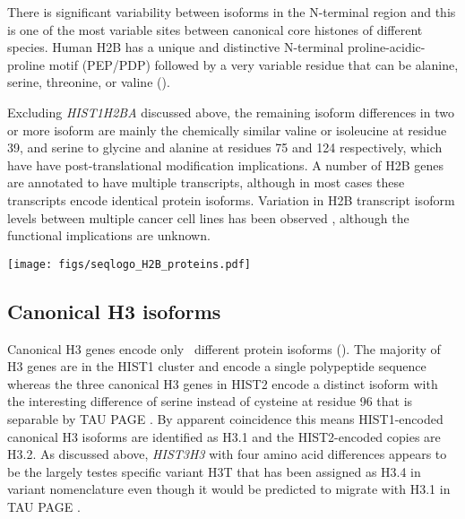     There is significant variability between isoforms in the N-terminal region
    and this is one of the most variable sites between canonical
    core histones of different species.
    Human H2B has a unique and distinctive N-terminal proline-acidic-proline motif (PEP/PDP)
    followed by a very variable residue that can be alanine, serine,
    threonine, or valine ().

    Excluding \textit{HIST1H2BA} discussed above,
    the remaining isoform differences in two or more isoform are mainly the chemically
    similar valine or isoleucine at residue 39,
    and serine to glycine and alanine at residues 75 and 124 respectively,
    which have have post-translational modification implications.
    A number of H2B genes are annotated to have multiple transcripts,
    although in most cases these transcripts encode identical protein isoforms.
    Variation in H2B transcript isoform levels between multiple cancer cell
    lines has been observed \citep{Molden2015},
    although the functional implications are unknown.

    \begin{table}
      \caption{%
        Canonical H2B encoded protein isoforms.
        Upper panel shows isoform variations relative to most common isoform
        using HGVS recommended nomenclature \citep{mutnomenclature2016}.
        For clarity, isoforms encoded by multiple transcripts of a single gene
        are distingushed by a numerical suffix
        (see ).
        Lower panel shows sequence logo of all isoforms aligned
        with invariant residues in grey.
      }
      \label{tab:H2B-consensus}
      
      \texttt{[image: figs/seqlogo\_H2B\_proteins.pdf]}
    \end{table}

  \subsection{Canonical H3 isoforms}
    Canonical H3 genes encode only \HThreeUniqueProteins{}~different
    protein isoforms ().
    The majority of H3 genes are in the HIST1 cluster and encode a
    single polypeptide sequence \citep{Ederveen2011}
    whereas the three canonical H3 genes in HIST2 encode a distinct isoform
    with the interesting difference of serine instead of cysteine at residue 96
    that is separable by TAU PAGE \citep{FranklinZweidler1977}.
    By apparent coincidence this means HIST1-encoded canonical H3 isoforms are
    identified as H3.1 and the HIST2-encoded copies are H3.2.
    As discussed above, \textit{HIST3H3} with four amino acid differences
    appears to be the largely testes specific variant H3T
    that has been assigned as H3.4 in variant nomenclature \citep{Talbert2012}
    even though it would be predicted to migrate with H3.1 in TAU PAGE \citep{FranklinZweidler1977}.

